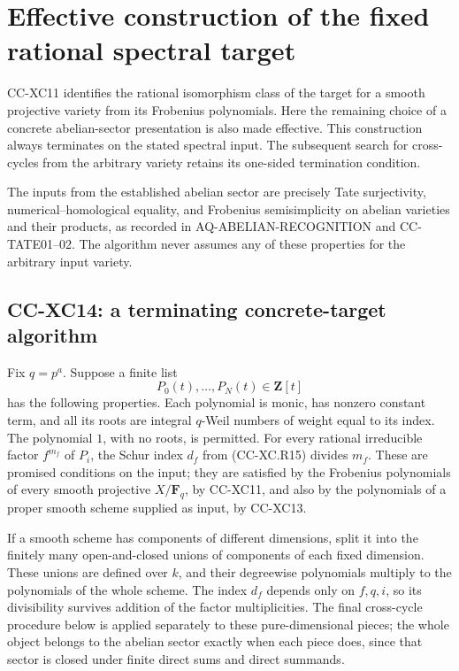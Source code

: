 \section{Effective construction of the fixed rational spectral
target}\label{effective-construction-of-the-fixed-rational-spectral-target}

CC-XC11 identifies the rational isomorphism class of the target for a
smooth projective variety from its Frobenius polynomials. Here the
remaining choice of a concrete abelian-sector presentation is also made
effective. This construction always terminates on the stated spectral
input. The subsequent search for cross-cycles from the arbitrary variety
retains its one-sided termination condition.

The inputs from the established abelian sector are precisely Tate
surjectivity, numerical--homological equality, and Frobenius
semisimplicity on abelian varieties and their products, as recorded in
AQ-ABELIAN-RECOGNITION and CC-TATE01--02. The algorithm never assumes
any of these properties for the arbitrary input variety.

\subsection{CC-XC14: a terminating concrete-target
algorithm}\label{cc-xc14-a-terminating-concrete-target-algorithm}

Fix \(q=p^a\). Suppose a finite list \[
 P_0(t),\ldots,P_N(t)\in\mathbf Z[t]                       \tag{CC-XC.E1}
\] has the following properties. Each polynomial is monic, has nonzero
constant term, and all its roots are integral \(q\)-Weil numbers of
weight equal to its index. The polynomial \(1\), with no roots, is
permitted. For every rational irreducible factor \(f^{m_f}\) of \(P_i\),
the Schur index \(d_f\) from (CC-XC.R15) divides \(m_f\). These are
promised conditions on the input; they are satisfied by the Frobenius
polynomials of every smooth projective \(X/\mathbf F_q\), by CC-XC11,
and also by the polynomials of a proper smooth scheme supplied as input,
by CC-XC13.

If a smooth scheme has components of different dimensions, split it into
the finitely many open-and-closed unions of components of each fixed
dimension. These unions are defined over \(k\), and their degreewise
polynomials multiply to the polynomials of the whole scheme. The index
\(d_f\) depends only on \(f,q,i\), so its divisibility survives addition
of the factor multiplicities. The final cross-cycle procedure below is
applied separately to these pure-dimensional pieces; the whole object
belongs to the abelian sector exactly when each piece does, since that
sector is closed under finite direct sums and direct summands.

